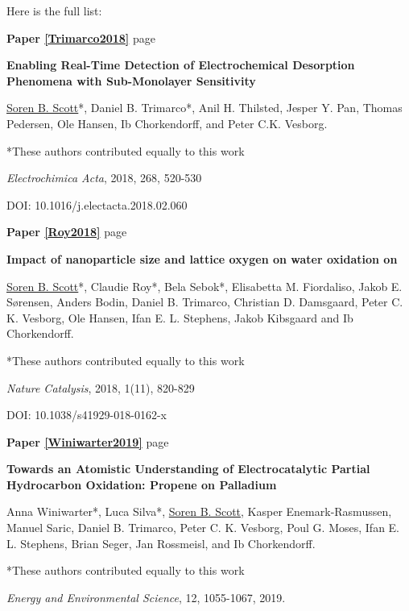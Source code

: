 Here is the full list:
\vspace{10mm}
\begin{flushleft}


\noindent\textbf{Paper \ref{Trimarco2018}} \hfill page~\pageref{Trimarco2018}

\textbf{Enabling Real-Time Detection of Electrochemical Desorption Phenomena with Sub-Monolayer Sensitivity} 

		\underline{Soren B. Scott}*, Daniel B. Trimarco*, Anil H. Thilsted, Jesper Y. Pan, Thomas Pedersen, Ole Hansen, Ib Chorkendorff, and Peter C.K. Vesborg. 
		
		*These authors contributed equally to this work
		
		\textit{Electrochimica Acta}, 2018, 268, 520-530
		
		DOI: 10.1016/j.electacta.2018.02.060
		
		


\vspace{5mm}
\noindent\textbf{Paper \ref{Roy2018}}  \hfill page~\pageref{Roy2018}

\textbf{Impact of nanoparticle size and lattice oxygen on water oxidation on } 

	\underline{Soren B. Scott}*, Claudie Roy*, Bela Sebok*, Elisabetta M. Fiordaliso, Jakob E. Sørensen, Anders Bodin, Daniel B. Trimarco, Christian D. Damsgaard, Peter C. K. Vesborg, Ole Hansen, Ifan E. L. Stephens, Jakob Kibsgaard and Ib Chorkendorff. 

	*These authors contributed equally to this work
	
	\textit{Nature Catalysis}, 2018, 1(11), 820-829 
	
	DOI: 10.1038/s41929-018-0162-x



\vspace{5mm}
\noindent\textbf{Paper \ref{Winiwarter2019}}  \hfill page~\pageref{Winiwarter2019}

\textbf{Towards an Atomistic Understanding of Electrocatalytic Partial Hydrocarbon Oxidation: Propene on Palladium} 

Anna Winiwarter*, Luca Silva*, \underline{Soren B. Scott}, Kasper Enemark-Rasmussen, Manuel Saric, Daniel B. Trimarco, Peter C. K. Vesborg, Poul G. Moses, Ifan E. L. Stephens, Brian Seger, Jan Rossmeisl, and Ib Chorkendorff.

*These authors contributed equally to this work

\textit{Energy and Environmental Science}, 12, 1055-1067, 2019.


\end{flushleft}
